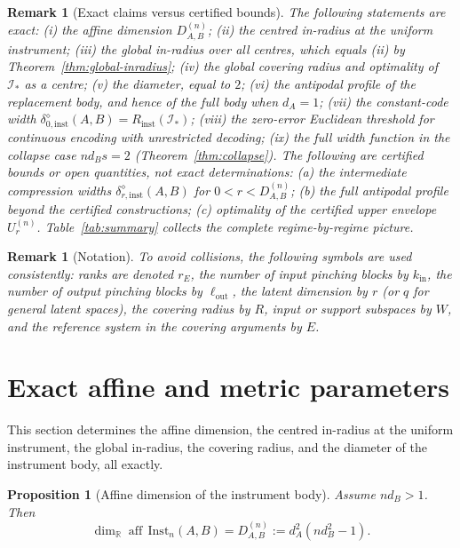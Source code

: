 \documentclass[11pt,a4paper]{article}
\newtheorem{proposition}[theorem]{Proposition}
\newtheorem{remark}[theorem]{Remark}
\newcommand{\Inst}{\mathrm{Inst}}
\newcommand{\aff}{\operatorname{aff}}
\begin{document}
\begin{remark}[Exact claims versus certified bounds]
\label{rem:exact-vs-certified}
The following statements are exact: (i) the affine dimension $D_{A,B}^{(n)}$; (ii) the centred in-radius at the uniform instrument; (iii) the global in-radius over all centres, which equals (ii) by Theorem~\ref{thm:global-inradius}; (iv) the global covering radius and optimality of $\mathcal I_*$ as a centre; (v) the diameter, equal to $2$; (vi) the antipodal profile of the replacement body, and hence of the full body when $d_A=1$; (vii) the constant-code width $\delta_{0,\mathrm{inst}}^{\diamond}(A,B)=R_{\mathrm{inst}}(\mathcal I_*)$; (viii) the zero-error Euclidean threshold for continuous encoding with unrestricted decoding; (ix) the full width function in the collapse case $nd_Bs=2$ (Theorem~\ref{thm:collapse}). The following are certified bounds or open quantities, not exact determinations: (a) the intermediate compression widths $\delta_{r,\mathrm{inst}}^{\diamond}(A,B)$ for $0<r<D_{A,B}^{(n)}$; (b) the full antipodal profile beyond the certified constructions; (c) optimality of the certified upper envelope $U_r^{(n)}$. Table~\ref{tab:summary} collects the complete regime-by-regime picture.
\end{remark}

\begin{remark}[Notation]
\label{rem:notation}
To avoid collisions, the following symbols are used consistently: ranks are denoted $r_E$, the number of input pinching blocks by $k_{\mathrm{in}}$, the number of output pinching blocks by $\ell_{\mathrm{out}}$, the latent dimension by $r$ (or $q$ for general latent spaces), the covering radius by $R$, input or support subspaces by $W$, and the reference system in the covering arguments by $E$.
\end{remark}

\section{Exact affine and metric parameters}
\label{sec:exact-geometry}

This section determines the affine dimension, the centred in-radius at the uniform instrument, the global in-radius, the covering radius, and the diameter of the instrument body, all exactly.

\begin{proposition}[Affine dimension of the instrument body]
\label{prop:dimension}
Assume $nd_B>1$. Then
\[
\dim_{\mathbb R}\aff\,\Inst_n(A,B)
=D_{A,B}^{(n)}:=d_A^2(nd_B^2-1).
\]
\end{proposition}
\end{document}

